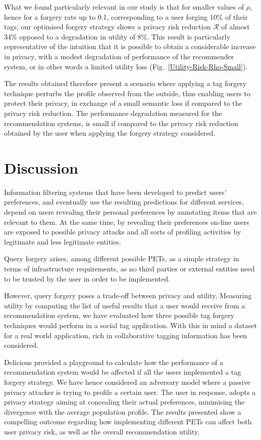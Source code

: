 What we found particularly relevant in our study is that for smaller values of $\rho$, hence for a forgery rate up to 0.1, corresponding to a user forging 10\% of their tags, our optimised forgery strategy shows a privacy risk reduction $\mathcal{R}$  of almost 34\% opposed to a degradation in utility of 8\%. This result is particularly representative of the intuition that it is possible to obtain a considerable increase in privacy, with a modest degradation of performance of the recommender system, or in other words a limited utility loss (Fig.~\ref{Utility-Risk-Rho-Small}).

The results obtained therefore present a scenario where applying a tag forgery technique perturbs the profile observed from the outside, thus enabling users to protect their privacy, in exchange of a small semantic loss if compared to the privacy risk reduction. The performance degradation measured for the recommendation systems, is small if compared to the privacy risk reduction obtained by the user when applying the forgery strategy considered.

\section{Discussion}
\label{sec:discussion}
Information filtering systems that have been developed to predict users' preferences, and eventually use the resulting predictions for different services, depend on users revealing their personal preferences by annotating items that are relevant to them.  At the same time, by revealing their preferences on-line users are exposed to possible privacy attacks and all sorts of profiling activities by legitimate and less legitimate entities.

Query forgery arises, among different possible PETs, as a simple strategy in terms of infrastructure requirements, as no third parties or external entities need to be trusted by the user in order to be implemented.

However, query forgery poses a trade-off between privacy and utility. Measuring utility by computing the list of useful results that a user would receive from a recommendation system, we have evaluated how three possible tag forgery techniques would perform in a social tag application. With this in mind a dataset for a real world application, rich in collaborative tagging information has been considered.

Delicious provided a playground to calculate how the performance of a recommendation system would be affected if all the users implemented a tag forgery strategy. We have hence considered an adversary model where a passive privacy attacker is trying to profile a certain user. The user in response, adopts a privacy strategy aiming at concealing their actual preferences, minimising the divergence with the average population profile. The results presented show a compelling outcome regarding  how implementing different PETs can affect both user privacy risk, as well as the overall recommendation utility.

